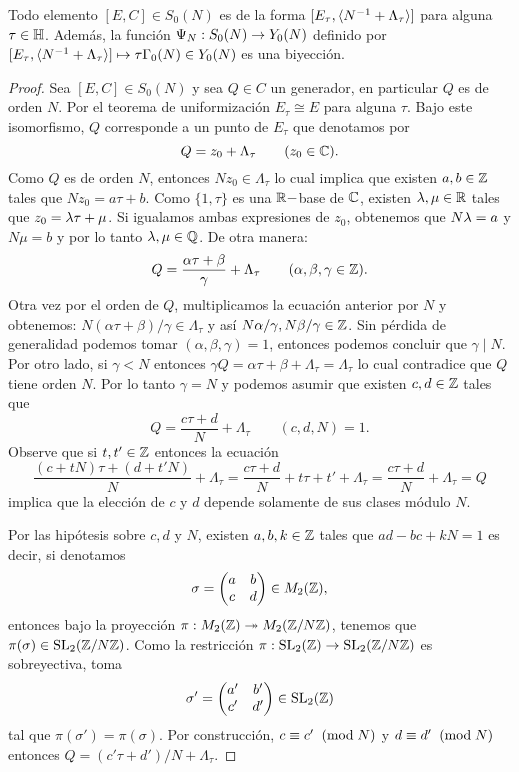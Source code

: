 \documentclass[../../tesis_maestria]{subfiles}
\begin{document}
\begin{lema}\label{lema:espacio_moduli_Y_0(N)}
	Todo elemento $[E,C]\in S_0(N)$ es de la forma $[E_\tau,\langle N^{-1}+\Lambda_\tau \rangle]$ para alguna $\tau\in\mathbb{H}$. Además, la función $\Psi_N:S_0(N)\rightarrow Y_0(N)$ definido por $[E_\tau,\langle N^{-1}+\Lambda_\tau \rangle]\mapsto \tau\Gamma_0(N)\in Y_0(N)$ es una biyección.
\end{lema}

\begin{proof}
Sea $[E,C]\in S_0(N)$ y sea $Q\in C$ un generador, en particular $Q$ es de orden $N$. Por el teorema de uniformización $E_\tau\cong E$ para alguna $\tau$. Bajo este isomorfismo, $Q$ corresponde a un punto de $E_\tau$ que denotamos por
\[	
	Q=z_0+\Lambda_\tau\qquad(z_0\in\mathbb{C}).
\]
Como $Q$ es de orden $N$, entonces $Nz_0\in\Lambda_\tau$ lo cual implica que existen $a,b\in\mathbb{Z}$ tales que $Nz_0=a\tau+b$. Como $\{1,\tau\}$ es una $\mathbb{R}-$base de $\mathbb{C}$, existen $\lambda,\mu\in\mathbb{R}$ tales que $z_0=\lambda\tau+\mu$. Si igualamos ambas expresiones de $z_0$, obtenemos que $N\lambda=a$ y $N\mu=b$ y por lo tanto $\lambda,\mu\in\mathbb{Q}$. De otra manera:
\[
	Q=\frac{\alpha\tau+\beta}{\gamma}+\Lambda_\tau\qquad(\alpha,\beta,\gamma\in\mathbb{Z}).
\]
Otra vez por el orden de $Q$, multiplicamos la ecuación anterior por $N$ y obtenemos: $N(\alpha\tau+\beta)/\gamma\in\Lambda_\tau$ y así $N\alpha/\gamma,N\beta/\gamma\in\mathbb{Z}$. Sin pérdida de generalidad podemos tomar $(\alpha,\beta,\gamma)=1$, entonces podemos concluir que $\gamma\mid N$. Por otro lado, si $\gamma<N$ entonces $\gamma Q=\alpha\tau+\beta+\Lambda_\tau=\Lambda_\tau$ lo cual contradice que $Q$ tiene orden $N$. Por lo tanto $\gamma=N$ y podemos asumir que existen $c,d\in\mathbb{Z}$ tales que
\[
	Q=\frac{c\tau+d}{N}+\Lambda_\tau\qquad(c,d,N)=1.
\]
Observe que si $t,t'\in\mathbb{Z}$ entonces la ecuación
\[
	\frac{(c+tN)\tau+(d+t'N)}{N}+\Lambda_\tau=
	\frac{c\tau+d}{N}+t\tau+t'+\Lambda_\tau=
	\frac{c\tau+d}{N}+\Lambda_\tau=Q
\]
implica que la elección de $c$ y $d$ depende solamente de sus clases módulo $N$.

Por las hipótesis sobre $c,d$ y $N$, existen $a,b,k\in\mathbb{Z}$ tales que $ad-bc+kN=1$ es decir, si denotamos
\[
	\sigma=\begin{pmatrix}a & b\\ c & d\end{pmatrix}\in M_2(\mathbb{Z}),
\]
entonces bajo la proyección $\pi:M_2(\mathbb{Z})\twoheadrightarrow M_2(\mathbb{Z}/N\mathbb{Z})$, tenemos que $\pi(\sigma)\in\mathrm{SL}_2(\mathbb{Z}/N\mathbb{Z})$. Como la restricción $\pi:\mathrm{SL}_2(\mathbb{Z})\rightarrow\mathrm{SL}_2(\mathbb{Z}/N\mathbb{Z})$ es sobreyectiva, toma $$\sigma'=\begin{pmatrix}a' & b'\\ c' & d'\end{pmatrix}\in\mathrm{SL}_2(\mathbb{Z})$$ tal que $\pi(\sigma')=\pi(\sigma)$. Por construcción, $c\equiv c'\;\;(\mathrm{mod}\; N)$ y $d\equiv d'\;\;(\mathrm{mod}\; N)$ entonces
$Q=(c'\tau+d')/N+\Lambda_{\tau}$.


\end{proof}
\end{document}
